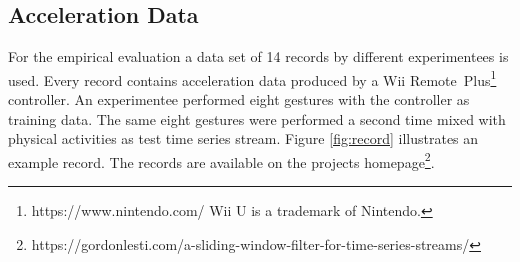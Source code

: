 \subsection{Acceleration Data} \label{acceleration_data}

For the empirical evaluation a data set of 14 records by different experimentees is used. Every record contains
acceleration data produced by a Wii
Remote\texttrademark~Plus\footnote{https://www.nintendo.com/ Wii U is a trademark of Nintendo.} controller. An
experimentee performed eight gestures with the controller as training data. The same eight gestures were performed a
second time mixed with physical activities as test time series stream. Figure \ref{fig:record} illustrates an example
record. The records are available on the projects
homepage\footnote{https://gordonlesti.com/a-sliding-window-filter-for-time-series-streams/}.

